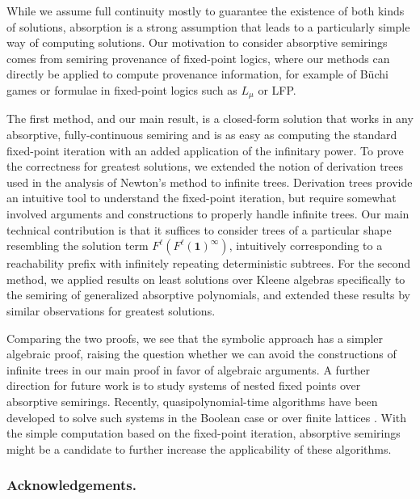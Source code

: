 \documentclass[english,runningheads,a4paper,envcountsame]{llncs}
\newcommand{\one}{\tup 1}
\newcommand*{\tup}[1]{\mathbf{#1}}
\begin{document}
While we assume full continuity mostly to guarantee the existence of both kinds of solutions, absorption is a strong assumption that leads to a particularly simple way of computing solutions.
Our motivation to consider absorptive semirings comes from semiring provenance of fixed-point logics, where our methods can directly be applied to compute provenance information, for example of Büchi games or formulae in fixed-point logics such as $L_\mu$ or LFP.

The first method, and our main result, is a closed-form solution that works in any absorptive, fully-continuous semiring and is as easy as computing the standard fixed-point iteration with an added application of the infinitary power.
To prove the correctness for greatest solutions, we extended the notion of derivation trees used in the analysis of Newton's method \cite{Newton} to infinite trees.
Derivation trees provide an intuitive tool to understand the fixed-point iteration, but require somewhat involved arguments and constructions to properly handle infinite trees.
Our main technical contribution is that it suffices to consider trees of a particular shape resembling the solution term $F^\ell(F^\ell(\one)^\infty)$, intuitively corresponding to a reachability prefix with infinitely repeating deterministic subtrees.
For the second method, we applied results on least solutions over Kleene algebras \cite{Kleene} specifically to the semiring of generalized absorptive polynomials, and extended these results by similar observations for greatest solutions.

Comparing the two proofs, we see that the symbolic approach has a simpler algebraic proof, raising the question whether we can avoid the constructions of infinite trees in our main proof in favor of algebraic arguments.
A further direction for future work is to study systems of nested fixed points over absorptive semirings.
Recently, quasipolynomial-time algorithms have been developed to solve such systems in the Boolean case \cite{ArnoldNiwinskiParys21} or over finite lattices \cite{HausmannSchroder19}.
With the simple computation based on the fixed-point iteration, absorptive semirings might be a candidate to further increase the applicability of these algorithms.




\subsubsection*{Acknowledgements.}
\end{document}
